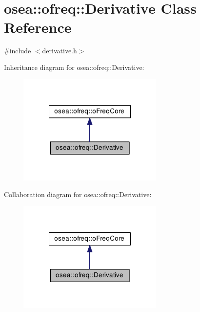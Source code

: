 \hypertarget{classosea_1_1ofreq_1_1_derivative}{\section{osea\-:\-:ofreq\-:\-:Derivative Class Reference}
\label{classosea_1_1ofreq_1_1_derivative}
}


{\ttfamily \#include $<$derivative.\-h$>$}



Inheritance diagram for osea\-:\-:ofreq\-:\-:Derivative\-:
\nopagebreak
\begin{figure}[H]
\begin{center}
\leavevmode
\includegraphics[width=204pt]{classosea_1_1ofreq_1_1_derivative__inherit__graph}
\end{center}
\end{figure}


Collaboration diagram for osea\-:\-:ofreq\-:\-:Derivative\-:
\nopagebreak
\begin{figure}[H]
\begin{center}
\leavevmode
\includegraphics[width=204pt]{classosea_1_1ofreq_1_1_derivative__coll__graph}
\end{center}
\end{figure}
